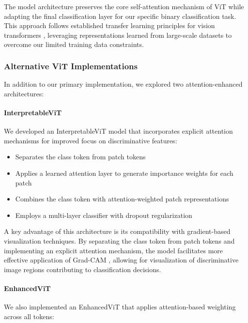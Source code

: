 \documentclass[a4paper,12pt]{report}
\begin{document}
The model architecture preserves the core self-attention mechanism of ViT while adapting the final classification layer for our specific binary classification task. This approach follows established transfer learning principles for vision transformers \citep{touvron2021trainingdataefficientimagetransformers}, leveraging representations learned from large-scale datasets to overcome our limited training data constraints.

\subsubsection{Alternative ViT Implementations}

In addition to our primary implementation, we explored two attention-enhanced architectures:

\paragraph{InterpretableViT}
We developed an InterpretableViT model that incorporates explicit attention mechanisms for improved focus on discriminative features:

\begin{itemize}
    \item Separates the class token from patch tokens
    \item Applies a learned attention layer to generate importance weights for each patch
    \item Combines the class token with attention-weighted patch representations
    \item Employs a multi-layer classifier with dropout regularization
\end{itemize}

A key advantage of this architecture is its compatibility with gradient-based visualization techniques. By separating the class token from patch tokens and implementing an explicit attention mechanism, the model facilitates more effective application of Grad-CAM \citep{Selvaraju_2019}, allowing for visualization of discriminative image regions contributing to classification decisions.


\paragraph{EnhancedViT}
We also implemented an EnhancedViT that applies attention-based weighting across all tokens:
\end{document}
